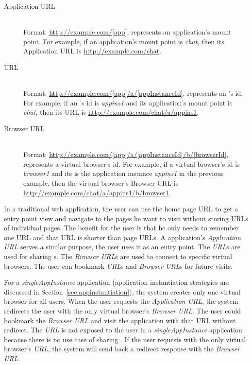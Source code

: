 \begin{description}

\item[Application URL] \label{itm:appurl} \hfill \\
Format: \url{http://example.com/[app]}, \code{[app]} represents an
application's mount point.   For example, if an application's mount point is
\emph{chat},  then its Application URL is \url{http://example.com/chat}.


\item[\appins{} URL] \label{itm:appinsurl} \hfill \\
Format: \url{http://example.com/[app]/a/[appInstanceId]},
\code{[appInstanceId]} represents an \appins{}'s id.  For example, if an
\appins{}'s id is \emph{appins1} and its application's mount point is
\emph{chat}, then its \appins{} URL is
\url{http://example.com/chat/a/appins1}.


\item[Browser URL] \label{itm:vburl} \hfill \\
Format: \url{http://example.com/[app]/a/[appInstanceId]/b/[browserId]},
\code{[browserId]} represents a virtual browser's id. For example, if a
virtual browser's id is \emph{browser1} and its \appins{} is the application
instance \emph{appins1} in the previous example, then the virtual browser's
Browser URL is \url{http://example.com/chat/a/appins1/b/browser1}.

\end{description}

In a traditional web application, the user can use the home page URL to get a 
entry point view and navigate to the pages he want to visit without
storing URLs of individual pages.
The benefit for the user is that he only needs to remember one URL and that URL
is shorter than page URLs.
A \cb application's \emph{Application URL} serves a similar purpose,
 the user uses it as an entry point.
The \emph{\appins URL}s are used for sharing \appins{}s.
The \emph{Browser URL}s are used to connect to specific virtual browsers.
The user can bookmark \emph{\appins URL}s and \emph{Browser URL}s for future
visits.

For a \emph{singleAppInstance} application (application instantiation
strategies  are discussed in Section~\ref{sec:appinstantiation}), the system
creates only one virtual browser for all users. When the user requests the
\emph{Application URL}, the system redirects the user with the only virtual
browser's \emph{Browser URL}. The user could bookmark the \emph{Browser URL}
and visit the application with that URL without redirect. The \emph{\appins
URL} is not exposed to the user in a \emph{singleAppInstance} application
because there is no use case of sharing \appins. If the user requests with the
only virtual browser's \emph{\appins URL}, the system will send back a
redirect response with the \emph{Browser URL}.



